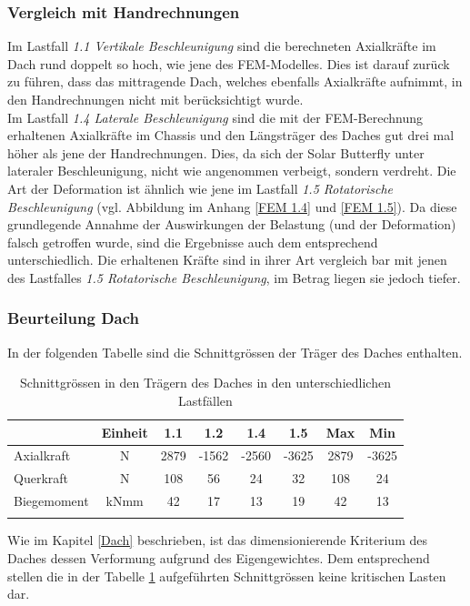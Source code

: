 \subsubsection{Vergleich mit Handrechnungen}
Im Lastfall \emph{1.1 Vertikale Beschleunigung} sind die berechneten Axialkräfte im Dach rund doppelt so hoch, wie jene des FEM-Modelles. Dies ist darauf zurück zu führen, dass das mittragende Dach, welches ebenfalls Axialkräfte aufnimmt, in den Handrechnungen nicht mit berücksichtigt wurde.\\
Im Lastfall \emph{1.4 Laterale Beschleunigung} sind die mit der FEM-Berechnung erhaltenen Axialkräfte im Chassis und den Längsträger des Daches gut drei mal höher als jene der Handrechnungen. Dies, da sich der Solar Butterfly unter lateraler Beschleunigung, nicht wie angenommen verbeigt, sondern verdreht. Die Art der Deformation ist ähnlich wie jene im Lastfall \emph{1.5 Rotatorische Beschleunigung} (vgl. Abbildung im Anhang \ref{FEM 1.4} und \ref{FEM 1.5}). Da diese grundlegende Annahme der Auswirkungen der Belastung (und der Deformation) falsch getroffen wurde, sind die Ergebnisse auch dem entsprechend unterschiedlich. Die erhaltenen Kräfte sind in ihrer Art vergleich bar mit jenen des Lastfalles \emph{1.5 Rotatorische Beschleunigung}, im Betrag liegen sie jedoch tiefer.\\



\subsubsection{Beurteilung Dach}
In der folgenden Tabelle sind die Schnittgrössen der Träger des Daches enthalten.

\begin{table}[H]
\centering
\begin{tabular}{lccccccc}
\thickhline
&	Einheit	&	1.1	&	1.2	&	1.4	&	1.5	&	Max	&	Min	\\	\hline
Axialkraft	&	N	&	2879	&	-1562	&	-2560	&	-3625	&	2879	&	-3625	\\
Querkraft	&	N	&	108	&	56	&	24	&	32	&	108	&	24	\\
Biegemoment	&	kNmm	&	42	&	17	&	13	&	19	&	42	&	13	\\	\thickhline
\end{tabular}
\caption{Schnittgrössen in den Trägern des Daches in den unterschiedlichen Lastfällen}
\label{tab:FEMres Dach}
\end{table}

Wie im Kapitel \ref{Dach} beschrieben, ist das dimensionierende Kriterium des Daches dessen Verformung aufgrund des Eigengewichtes. Dem entsprechend stellen die in der Tabelle \ref{tab:FEMres Dach} aufgeführten Schnittgrössen keine kritischen Lasten dar.\\



